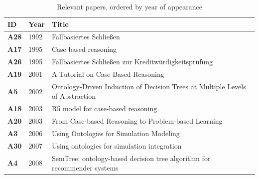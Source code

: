             
        	    {
        	    \begin{longtable}{ | m{1cm} | m{1.5cm} | m{12cm} | }
                    \caption{\label{tab:rel-papers} Relevant papers, ordered by year of appearance}\\
                    \hline
                    \rowcolor{teal!30} \textbf{ID} &\textbf{Year} &\textbf{Title} \\
                    \hline
                    \endfirsthead
                    
                    \hline
                    \textbf{A28} &1992 &Fallbasiertes Schließen \\ %
                    \hline
                    \textbf{A17} &1995 &Case based reasoning \\ %
                    \hline
                    \textbf{A26} &1995 &Fallbasiertes Schließen zur Kreditwürdigkeitsprüfung \\ %
                    \hline
                    \textbf{A19} &2001 &A Tutorial on Case Based Reasoning \\ %
                    \hline
                    \textbf{A5} &2002 &Ontology-Driven Induction of Decision Trees at Multiple Levels of Abstraction \\ %
                    \hline
                    \textbf{A18} &2003 &R5 model for case-based reasoning \\ %
                    \hline
                    \textbf{A20} &2003 &From Case-based Reasoning to Problem-based Learning \\ %
                    \hline
                    \textbf{A3} &2006 &Using Ontologies for Simulation Modeling \\ %
                    \hline
                    \textbf{A30} &2007 &Using ontologies for simulation integration \\ %
                    \hline
                    \textbf{A4} &2008 &SemTree: ontology-based decision tree algorithm for recommender systems \\ %

\end{longtable}}
